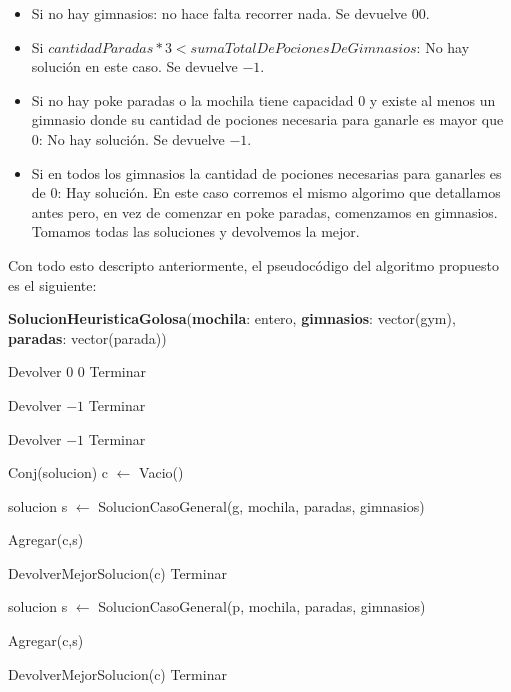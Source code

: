 \begin{itemize}

\item Si no hay gimnasios: no hace falta recorrer nada. Se devuelve $0 0$.

\item Si $cantidadParadas*3 < sumaTotalDePocionesDeGimnasios$: No hay solución en este caso. Se devuelve $-1$.

\item Si no hay poke paradas o la mochila tiene capacidad $0$ y existe al menos un gimnasio donde su cantidad de pociones necesaria para ganarle es mayor que $0$: No hay solución. Se devuelve $-1$.

\item Si en todos los gimnasios la cantidad de pociones necesarias para ganarles es de $0$: Hay solución. En este caso corremos el mismo algorimo que detallamos antes pero, en vez de comenzar en poke paradas, comenzamos en gimnasios. Tomamos todas las soluciones y devolvemos la mejor.

\end{itemize}

Con todo esto descripto anteriormente, el pseudocódigo del algoritmo propuesto es el siguiente:

\begin{algorithm}[H]
\label{}
\caption{\textbf{SolucionHeuristicaGolosa}(\textbf{mochila}: entero, \textbf{gimnasios}: vector(gym), \textbf{paradas}: vector(parada))}
\begin{algorithmic}[1]

	\State Devolver $0$ $0$
	\State Terminar
\EndIf

	\State Devolver $-1$
	\State Terminar
\EndIf

	\State Devolver $-1$
	\State Terminar
\EndIf

\State Conj(solucion) c $\leftarrow$ Vacio()




		\State solucion s $\leftarrow$ SolucionCasoGeneral(g, mochila, paradas, gimnasios)

		\State Agregar(c,s)

	\EndFor

	\State DevolverMejorSolucion(c)
	\State Terminar
\Else


		\State solucion s $\leftarrow$ SolucionCasoGeneral(p, mochila, paradas, gimnasios)

		\State Agregar(c,s)

	\EndFor

\EndIf

\State DevolverMejorSolucion(c)
\State Terminar

\medskip
\Statex \underline{}
\end{algorithmic}
\end{algorithm}

